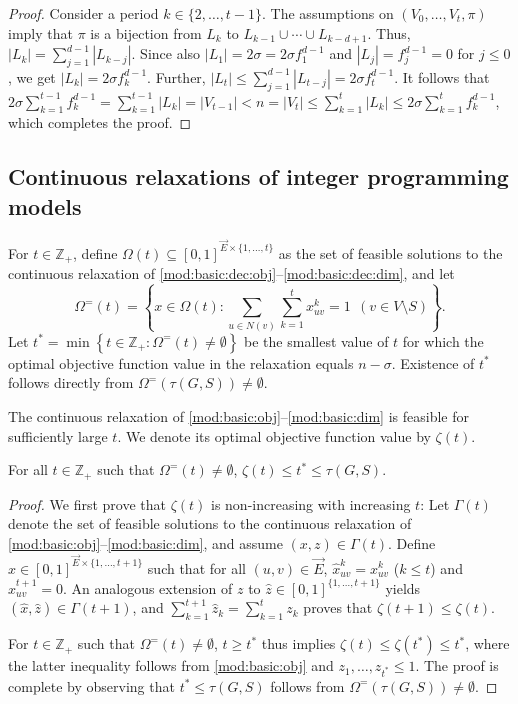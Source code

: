 \begin{proof}
Consider a period $k\in\{2,\ldots,t-1\}$.
The assumptions on $\left(V_0,\ldots,V_t,\pi\right)$ imply that $\pi$ is a bijection from $L_k$ to $L_{k-1}\cup\cdots\cup L_{k-d+1}$.
Thus, $\left|L_k\right|=\sum_{j=1}^{d-1}\left|L_{k-j}\right|$.
Since also $\left|L_1\right|=2\sigma=2\sigma f_1^{d-1}$ and $\left|L_j\right|=f_j^{d-1}=0$ for $j\leq 0$,
we get $\left|L_k\right|=2\sigma f_k^{d-1}$.
Further, $\left|L_t\right|\leq\sum_{j=1}^{d-1}\left|L_{t-j}\right|=2\sigma f_t^{d-1}$.
It follows that $2\sigma\sum_{k=1}^{t-1}f_k^{d-1}=\sum_{k=1}^{t-1}\left|L_k\right|=\left|V_{t-1}\right|<n=\left|V_t\right|\leq\sum_{k=1}^t\left|L_k\right|\leq 2\sigma\sum_{k=1}^tf_k^{d-1}$,
which completes the proof.
\end{proof}

\subsection{Continuous relaxations of integer programming models} \label{sec:lblprel}

For $t\in\mathbb{Z}_+$, define $\Omega(t)\subseteq[0,1]^{\overrightarrow{E}\times\{1,\ldots,t\}}$ as the set of feasible solutions to the continuous relaxation of
\eqref{mod:basic:dec:obj}--\eqref{mod:basic:dec:dim},
and let
\[
 \Omega^=(t) = \left\{x\in\Omega(t): \sum\limits_{u \in N(v)} \sum\limits_{k=1}^tx_{uv}^k = 1 ~~(v\in V\setminus S)\right\}.
\]
Let $t^{\ast}=\min\left\{t\in\mathbb{Z}_+: \Omega^=(t)\neq\emptyset\right\}$ be the smallest value of $t$ for which the optimal objective function value in
the relaxation equals $n-\sigma$.
Existence of $t^{\ast}$ follows directly from $\Omega^=\left(\tau(G,S)\right)\neq\emptyset$.

The continuous relaxation of \eqref{mod:basic:obj}--\eqref{mod:basic:dim} is feasible for sufficiently large $t$.
We denote its optimal objective function value by $\zeta(t)$.

\begin{proposition} \label{prop:lpweak}
For all $t\in\mathbb{Z}_+$ such that $\Omega^=(t)\neq\emptyset$, $\zeta(t)\leq t^{\ast}\leq\tau(G,S)$.
\end{proposition}
\begin{proof}
We first prove that $\zeta(t)$ is non-increasing with increasing $t$:
Let $\Gamma(t)$ denote the set of feasible solutions to the continuous relaxation of \eqref{mod:basic:obj}--\eqref{mod:basic:dim}, and assume $(x,z)\in\Gamma(t)$.
Define $\hat{x}\in[0,1]^{\overrightarrow{E}\times\{1,\ldots,t+1\}}$ such that
for all $(u,v)\in \overrightarrow{E}$, $\hat{x}_{uv}^k=x_{uv}^k$ ($k\leq t$) and $\hat{x}_{uv}^{t+1}=0$.
An analogous extension of $z$ to $\hat{z}\in[0,1]^{\{1,\ldots,t+1\}}$ yields $(\hat{x},\hat{z})\in\Gamma(t+1)$,
and $\sum_{k=1}^{t+1}\hat{z}_k=\sum_{k=1}^tz_k$ proves that $\zeta(t+1)\leq\zeta(t)$.

For $t\in\mathbb{Z}_+$ such that $\Omega^=(t)\neq\emptyset$, $t\geq t^{\ast}$ thus implies $\zeta(t)\leq\zeta(t^{\ast})\leq t^{\ast}$,
where the latter inequality follows from \eqref{mod:basic:obj} and $z_1,\ldots,z_{t^{\ast}}\leq 1$.
The proof is complete by observing that $t^{\ast}\leq\tau(G,S)$ follows from $\Omega^=\left(\tau(G,S)\right)\neq\emptyset$.
\end{proof}

